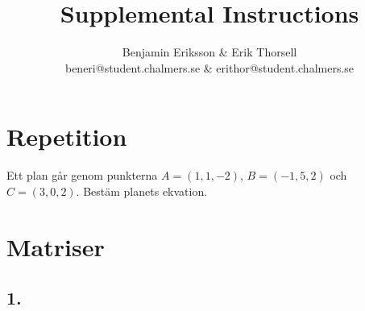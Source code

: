\documentclass{article}
\title{Supplemental Instructions}
\author{Benjamin Eriksson \& Erik Thorsell \\ 
		\small{beneri@student.chalmers.se} \&
		\small{erithor@student.chalmers.se}
}
\date{
     }
\begin{document}
\maketitle


\section*{Repetition}
Ett plan går genom punkterna $A=(1,1,-2)$, $B=(-1,5,2)$ och $C=(3,0,2)$.
Bestäm planets ekvation.\\

\section*{Matriser}
\subsection*{1.}
\end{document}
